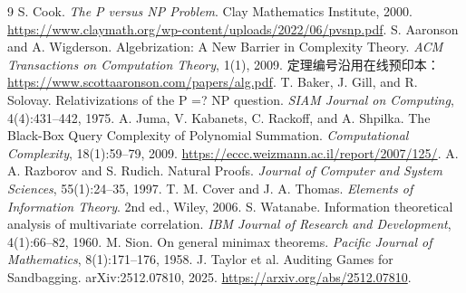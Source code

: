 \documentclass[11pt,a4paper]{article}
\begin{document}
\begin{thebibliography}{9}\small\setlength{\itemsep}{1pt}\setlength{\parskip}{0pt}
 S. Cook. \emph{The P versus NP Problem}. Clay Mathematics Institute, 2000. \url{https://www.claymath.org/wp-content/uploads/2022/06/pvsnp.pdf}.
 S. Aaronson and A. Wigderson. Algebrization: A New Barrier in Complexity Theory. \emph{ACM Transactions on Computation Theory}, 1(1), 2009. 定理编号沿用在线预印本： \url{https://www.scottaaronson.com/papers/alg.pdf}.
 T. Baker, J. Gill, and R. Solovay. Relativizations of the P =? NP question. \emph{SIAM Journal on Computing}, 4(4):431--442, 1975.
 A. Juma, V. Kabanets, C. Rackoff, and A. Shpilka. The Black-Box Query Complexity of Polynomial Summation. \emph{Computational Complexity}, 18(1):59--79, 2009. \url{https://eccc.weizmann.ac.il/report/2007/125/}.
 A. A. Razborov and S. Rudich. Natural Proofs. \emph{Journal of Computer and System Sciences}, 55(1):24--35, 1997.
 T. M. Cover and J. A. Thomas. \emph{Elements of Information Theory}. 2nd ed., Wiley, 2006.
 S. Watanabe. Information theoretical analysis of multivariate correlation. \emph{IBM Journal of Research and Development}, 4(1):66--82, 1960.
 M. Sion. On general minimax theorems. \emph{Pacific Journal of Mathematics}, 8(1):171--176, 1958.
 J. Taylor et al. Auditing Games for Sandbagging. arXiv:2512.07810, 2025. \url{https://arxiv.org/abs/2512.07810}.
\end{thebibliography}
\end{document}
